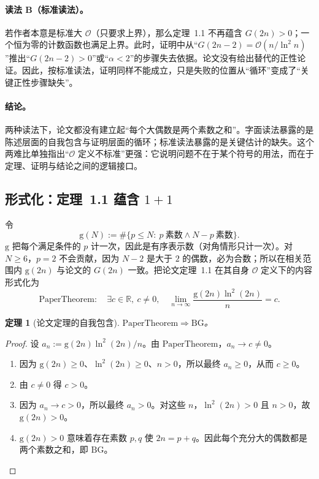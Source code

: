 \documentclass[11pt,a4paper]{ctexart}
\theoremstyle{plain}
\newtheorem{theorem}{定理}[section]
\theoremstyle{definition}
\newcommand{\BG}{\mathrm{BG}}
\newcommand{\PaperTheorem}{\mathrm{PaperTheorem}}
\newcommand{\g}{\mathrm{g}}
\newcommand{\R}{\mathbb{R}}
\begin{document}
\paragraph{读法 B（标准读法）。}
若作者本意是标准大 $\mathcal O$（只要求上界），那么定理~1.1 不再蕴含 $G(2n)>0$；一个恒为零的计数函数也满足上界。此时，证明中从“$G(2n-2)=\mathcal O(n/\ln^2 n)$”推出“$G(2n-2)>0$”或“$\alpha<2$”的步骤失去依据。论文没有给出替代的正性论证。因此，按标准读法，证明同样不能成立，只是失败的位置从“循环”变成了“关键正性步骤缺失”。

\paragraph{结论。}
两种读法下，论文都没有建立起“每个大偶数是两个素数之和”。字面读法暴露的是陈述层面的自我包含与证明层面的循环；标准读法暴露的是关键估计的缺失。这个两难比单独指出“$\mathcal O$ 定义不标准”更强：它说明问题不在于某个符号的用法，而在于定理、证明与结论之间的逻辑接口。

\subsection{形式化：定理~1.1 蕴含 $1+1$}
\label{sec:paper-formal}

令
\begin{equation}
\g(N):=\#\{p\le N:\ p\ \text{素数}\land N-p\ \text{素数}\}.
\label{eq:count}
\end{equation}
$\g$ 把每个满足条件的 $p$ 计一次，因此是有序表示数（对角情形只计一次）。对 $N\ge6$，$p=2$ 不会贡献，因为 $N-2$ 是大于 $2$ 的偶数，必为合数；所以在相关范围内 $\g(2n)$ 与论文的 $G(2n)$ 一致。把论文定理~1.1 在其自身 $\mathcal O$ 定义下的内容形式化为
\begin{equation}
\PaperTheorem:\quad \exists c\in\R,\ c\ne0,\quad
\lim_{n\to\infty}\frac{\g(2n)\ln^2(2n)}{n}=c.
\label{eq:papertheorem}
\end{equation}

\begin{theorem}[论文定理的自我包含]
\label{thm:paper-implies-bg}
$\PaperTheorem\Longrightarrow\BG$。
\end{theorem}

\begin{proof}
设 $a_n:=\g(2n)\ln^2(2n)/n$。由 $\PaperTheorem$，$a_n\to c\ne0$。

\begin{enumerate}[label=(\roman*)]
\item 因为 $\g(2n)\ge0$、$\ln^2(2n)\ge0$、$n>0$，所以最终 $a_n\ge0$，从而 $c\ge0$。
\item 由 $c\ne0$ 得 $c>0$。
\item 因为 $a_n\to c>0$，所以最终 $a_n>0$。对这些 $n$，$\ln^2(2n)>0$ 且 $n>0$，故 $\g(2n)>0$。
\item $\g(2n)>0$ 意味着存在素数 $p,q$ 使 $2n=p+q$。因此每个充分大的偶数都是两个素数之和，即 $\BG$。
\end{enumerate}
\end{proof}
\end{document}
